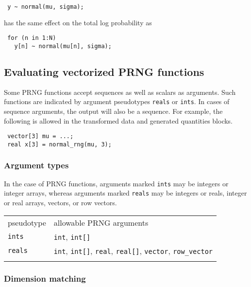 \documentclass[
  10pt,
]{book}
\begin{document}
\begin{verbatim}
 y ~ normal(mu, sigma);
\end{verbatim}

has the same effect on the total log probability as

\begin{verbatim}
 for (n in 1:N)
   y[n] ~ normal(mu[n], sigma);
\end{verbatim}

\hypertarget{prng-vectorization}{%
\subsection{Evaluating vectorized PRNG functions}\label{prng-vectorization}}

Some PRNG functions accept sequences as well as scalars as arguments.
Such functions are indicated by argument pseudotypes \texttt{reals} or
\texttt{ints}. In cases of sequence arguments, the output will also be a
sequence. For example, the following is allowed in the transformed data and
generated quantities blocks.

\begin{verbatim}
 vector[3] mu = ...;
 real x[3] = normal_rng(mu, 3);
\end{verbatim}

\hypertarget{argument-types}{%
\subsubsection{Argument types}\label{argument-types}}

In the case of PRNG functions, arguments marked \texttt{ints} may be integers
or integer arrays, whereas arguments marked \texttt{reals} may be integers or
reals, integer or real arrays, vectors, or row vectors.

\begin{longtable}[]{@{}ll@{}}
\toprule
pseudotype & allowable PRNG arguments \\ \addlinespace
\midrule
\endhead
\texttt{ints} & \texttt{int}, \texttt{int{[}{]}} \\ \addlinespace
\texttt{reals} & \texttt{int}, \texttt{int{[}{]}}, \texttt{real}, \texttt{real{[}{]}}, \texttt{vector}, \texttt{row\_vector} \\ \addlinespace
\bottomrule
\end{longtable}

\hypertarget{dimension-matching}{%
\subsubsection{Dimension matching}\label{dimension-matching}}
\end{document}
